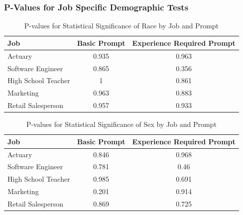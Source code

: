 \documentclass[11pt,letterpaper]{article}
\begin{document}
\subsubsection{P-Values for Job Specific Demographic Tests}

\begin{table}[h]
\centering
\caption{P-values for Statistical Significance of Race by Job and Prompt}
\begin{tabular}{lcc}
\hline
\textbf{Job} & \textbf{Basic Prompt} & \textbf{Experience Required Prompt} \\
\hline
Actuary & 0.935  & 0.963 \\
Software Engineer & 0.865  & 0.356 \\
High School Teacher & 1  & 0.861  \\
Marketing & 0.963  & 0.883 \\
Retail Salesperson & 0.957  & 0.933  \\
\hline
\end{tabular}
\label{tab:pvalues_by_job}
\end{table}

\begin{table}[H]
\centering
\caption{P-values for Statistical Significance of Sex by Job and Prompt}
\begin{tabular}{lcc}
\hline
\textbf{Job} & \textbf{Basic Prompt} & \textbf{Experience Required Prompt} \\
\hline
Actuary & 0.846  & 0.968 \\
Software Engineer & 0.781  & 0.46 \\
High School Teacher & 0.985  & 0.691  \\
Marketing & 0.201  & 0.914  \\
Retail Salesperson & 0.869  & 0.725  \\
\hline
\end{tabular}
\label{tab:pvalues_by_job}
\end{table}
\end{document}
